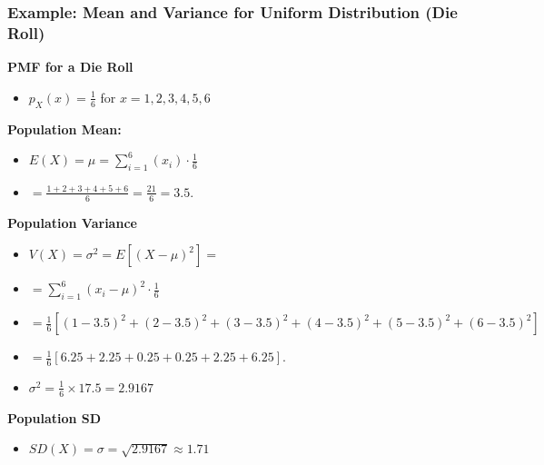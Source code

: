 \documentclass[handout]{beamer} %
\begin{document}
\begin{frame} %
\frametitle{Example: Mean and Variance for Uniform Distribution (Die Roll)}

\begin{minipage}{0.45\textwidth}
\textbf{PMF for a Die Roll}
\begin{itemize}
    \item $p_X(x) = \frac{1}{6}$ for $x = 1, 2, 3, 4, 5, 6$
\end{itemize}
  \pause
\textbf{Population Mean:}
\begin{itemize}
    \pause
    \item  $E(X) = \mu = \sum_{i=1}^{6} (x_i) \cdot \frac{1}{6}$
    \pause
    \item[{}] $=\frac{1 + 2 + 3 + 4 + 5 + 6}{6} = \frac{21}{6} = 3.5.$
\end{itemize}
\end{minipage}
\hfill
\begin{minipage}{0.45\textwidth}
\textbf{Population Variance}
  \pause
\begin{itemize}
    \item $V(X) = \sigma^2 = E[(X-\mu)^2] =$ 
    \pause
    \item[{}] $ =\sum_{i=1}^{6} (x_i - \mu)^2 \cdot \frac{1}{6}$
    \pause
    \item[{}] $= \frac{1}{6} [(1-3.5)^2 + (2-3.5)^2 + (3-3.5)^2 + (4-3.5)^2 + (5-3.5)^2 + (6-3.5)^2]$
    \pause
    \item[{}] $= \frac{1}{6} [6.25 + 2.25 + 0.25 + 0.25 + 2.25 + 6.25].$
    \pause
    \item $\sigma^2 = \frac{1}{6} \times 17.5 = 2.9167$
\end{itemize}
  \pause
\textbf{Population SD}
\begin{itemize}
    \pause
    \item $SD(X) = \sigma = \sqrt{2.9167} \approx 1.71$
\end{itemize}
\end{minipage}

\end{frame}
\end{document}

